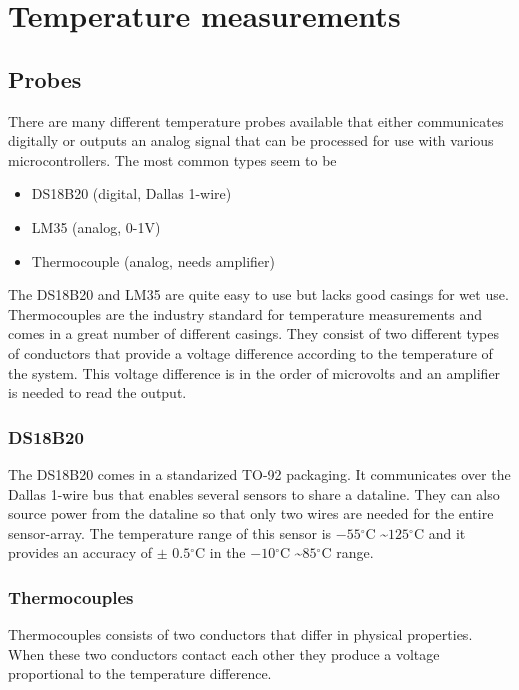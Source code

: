 \documentclass[11pt,fleqn]{book} %
\newcommand{\degree}{\ensuremath{^\circ}}
\begin{document}
\section{Temperature measurements}

\subsection{Probes}

There are many different temperature probes available that either communicates digitally or outputs an analog signal that can be processed for use with various microcontrollers. The most common types seem to be

\begin{itemize}
\item DS18B20 (digital, Dallas 1-wire)
\item LM35 (analog, 0-1V)
\item Thermocouple (analog, needs amplifier)
\end{itemize}

The DS18B20 and LM35 are quite easy to use but lacks good casings for wet use. Thermocouples are the industry standard for temperature measurements and comes in a great number of different casings. They consist of two different types of conductors that provide a voltage difference according to the temperature of the system. This voltage difference is in the order of microvolts and an amplifier is needed to read the output.

\subsubsection{DS18B20}

The DS18B20 comes in a standarized TO-92 packaging. It communicates over the Dallas 1-wire bus that enables several sensors to share a dataline. They can also source power from the dataline so that only two wires are needed for the entire sensor-array.
The temperature range of this sensor is $-55\degree$C \textasciitilde $125\degree$C and it provides an accuracy of $\pm$ $0.5\degree$C in the $-10\degree$C \textasciitilde $85\degree$C range.

\subsubsection{Thermocouples}

Thermocouples consists of two conductors that differ in physical properties. When these two conductors contact each other they produce a voltage proportional to the temperature difference.
\end{document}
